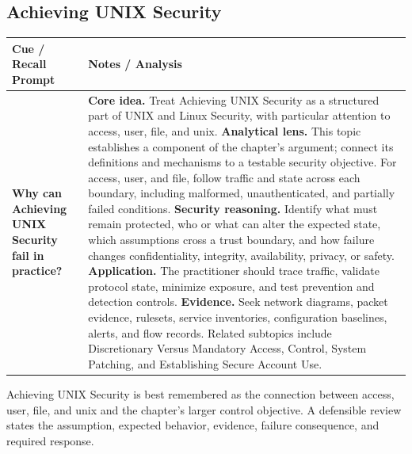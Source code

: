 \documentclass[11pt]{article}
\newcommand{\CornellHeader}{%
\rowcolor{Navy}\color{white}\bfseries Cue / Recall Prompt & \color{white}\bfseries Notes / Analysis\\\hline}
\newcommand{\CornellRow}[2]{%
\cellcolor{CueGray}\RaggedRight\textbf{#1} & \RaggedRight #2\\\hline}
\begin{document}
\subsection*{Achieving UNIX Security}
\begin{longtable}{>{\RaggedRight\arraybackslash}p{}|>{\RaggedRight\arraybackslash}p{}}
\CornellHeader
\CornellRow{Why can Achieving UNIX Security fail in practice?}{\textbf{Core idea.} Treat Achieving UNIX Security as a structured part of UNIX and Linux Security, with particular attention to access, user, file, and unix. \textbf{Analytical lens.} This topic establishes a component of the chapter's argument; connect its definitions and mechanisms to a testable security objective. For access, user, and file, follow traffic and state across each boundary, including malformed, unauthenticated, and partially failed conditions. \textbf{Security reasoning.} Identify what must remain protected, who or what can alter the expected state, which assumptions cross a trust boundary, and how failure changes confidentiality, integrity, availability, privacy, or safety. \textbf{Application.} The practitioner should trace traffic, validate protocol state, minimize exposure, and test prevention and detection controls. \textbf{Evidence.} Seek network diagrams, packet evidence, rulesets, service inventories, configuration baselines, alerts, and flow records. Related subtopics include Discretionary Versus Mandatory Access, Control, System Patching, and Establishing Secure Account Use.}
\end{longtable}
\begin{topicsummary}
Achieving UNIX Security is best remembered as the connection between access, user, file, and unix and the chapter's larger control objective. A defensible review states the assumption, expected behavior, evidence, failure consequence, and required response.
\end{topicsummary}
\end{document}
